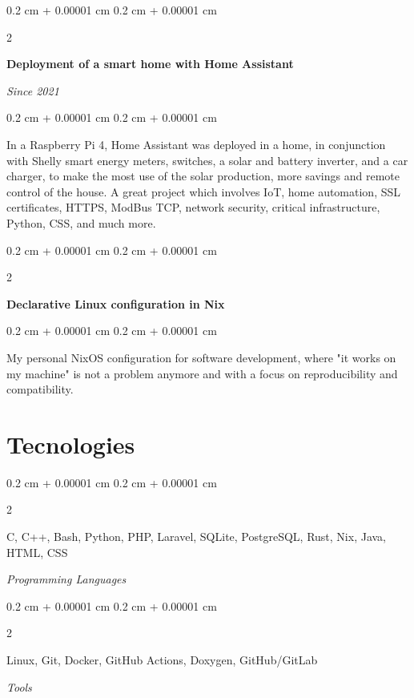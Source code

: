 \documentclass[10pt, letterpaper]{article}
\newenvironment{onecolentry}{
    \begin{adjustwidth}{
        0.2 cm + 0.00001 cm
    }{
        0.2 cm + 0.00001 cm
    }
}{
    \end{adjustwidth}
} %
\newenvironment{twocolentry}[2][]{
    \onecolentry
    \def\secondColumn{#2}
    \setcolumnwidth{\fill, 6.4 cm}
    \begin{paracol}{2}
}{
    \switchcolumn \raggedleft \secondColumn
    \end{paracol}
    \endonecolentry
} %
\let\hrefWithoutArrow\href
\renewcommand{\href}[2]{\hrefWithoutArrow{#1}{\ifthenelse{\equal{#2}{}}{ }{#2 }\raisebox{.15ex}{\footnotesize \faExternalLink*}}}
\begin{document}
        \vspace{0.2 cm}

        \begin{twocolentry}
            {\textit{Since 2021}}
            {\textbf{Deployment of a smart home with Home Assistant}}
        \end{twocolentry}
        \vspace{0.1 cm}
        \begin{onecolentry}
            In a Raspberry Pi 4, Home Assistant was deployed in a home, in conjunction with Shelly smart energy meters, switches, a solar and battery inverter, and a car charger, to make the most use of the solar production, more savings and remote control of the house. A great project which involves IoT, home automation, SSL certificates, HTTPS, ModBus TCP, network security, critical infrastructure, Python, CSS, and much more.
        \end{onecolentry}

        \vspace{0.2 cm}

        \begin{twocolentry}
            {\textit{\href{https://github.com/jvdcf-dev/nix}{nix.git}}}
            {\textbf{Declarative Linux configuration in Nix}}
        \end{twocolentry}
        \vspace{0.1 cm}
        \begin{onecolentry}
            My personal NixOS configuration for software development, where "it works on my machine" is not a problem anymore and with a focus on reproducibility and compatibility.
        \end{onecolentry}

    \vspace{0.3 cm}
    \section{Tecnologies}

    \begin{twocolentry}
        {\textit{Programming Languages}}
        {C, C++, Bash, Python, PHP, Laravel, SQLite, PostgreSQL, Rust, Nix, Java, HTML, CSS}
    \end{twocolentry}
    \vspace{0.1 cm}
    \begin{twocolentry}
        {\textit{Tools}}
        {Linux, Git, Docker, GitHub Actions, Doxygen, GitHub/GitLab}
    \end{twocolentry}
    
\end{document}
